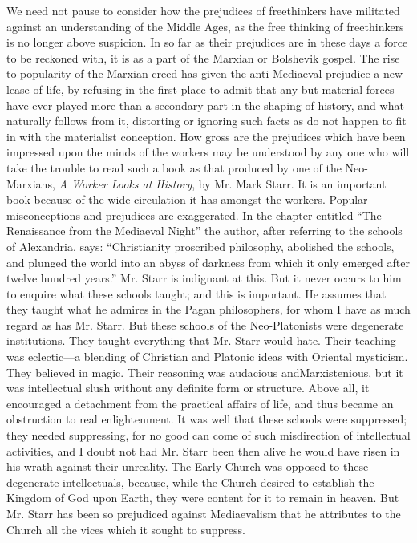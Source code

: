 \documentclass{book}
\begin{document}
We need not pause to consider how the prejudices of freethinkers have militated against an understanding of the Middle Ages, as the free thinking of freethinkers is no longer above suspicion. In so far as their prejudices are in these days a force to be reckoned with, it is as a part of the Marxian or Bolshevik gospel. The rise to popularity of the Marxian creed has given the anti-Mediaeval prejudice a new lease of life, by refusing in the first place to admit that any but material forces have ever played more than a secondary part in the shaping of history, and what naturally follows from it, distorting or ignoring such facts as do not happen to fit in with the materialist conception. How gross are the prejudices which have been impressed upon the minds of the workers may be understood by any one who will take the trouble to read such a book as that produced by one of the Neo-Marxians, \emph{A Worker Looks at History}, by Mr. Mark Starr. It is an important book because of the wide circulation it has amongst the workers. Popular misconceptions and prejudices are exaggerated. In the chapter entitled “The Renaissance from the Mediaeval Night” the author, after referring to the schools of Alexandria, says: “Christianity proscribed philosophy, abolished the schools, and plunged the world into an abyss of darkness from which it only emerged after twelve hundred years.” Mr. Starr is indignant at this. But it never occurs to him to enquire what these schools taught; and this is important. He assumes that they taught what he admires in the Pagan philosophers, for whom I have as much regard as has Mr. Starr. But these schools of the Neo-Platonists were degenerate institutions. They taught everything that Mr. Starr would hate. Their teaching was eclectic—a blending of Christian and Platonic ideas with Oriental mysticism. They believed in magic. Their reasoning was audacious andMarxistenious, but it was intellectual slush without any definite form or structure. Above all, it encouraged a detachment from the practical affairs of life, and thus became an obstruction to real enlightenment. It was well that these schools were suppressed; they needed suppressing, for no good can come of such misdirection of intellectual activities, and I doubt not had Mr. Starr been then alive he would have risen in his wrath against their unreality. The Early Church was opposed to these degenerate intellectuals, because, while the Church desired to establish the Kingdom of God upon Earth, they were content for it to remain in heaven. But Mr. Starr has been so prejudiced against Mediaevalism that he attributes to the Church all the vices which it sought to suppress.
\end{document}

